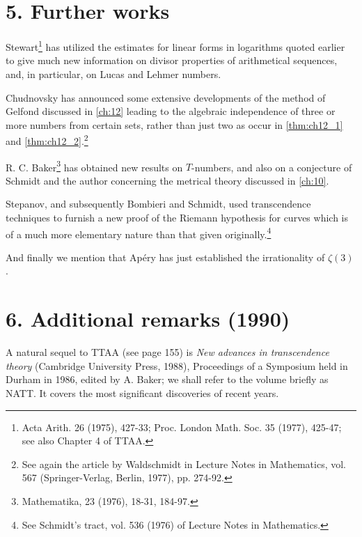 \section*{5. Further works}

Stewart\footnote{Acta Arith. 26 (1975), 427-33; Proc. London Math. Soc. 35 (1977), 425-47; see also Chapter 4 of TTAA.} has utilized the estimates for linear forms in logarithms quoted earlier to give much new information on divisor properties of arithmetical sequences, and, in particular, on Lucas and Lehmer numbers.

Chudnovsky has announced some extensive developments of the method of Gelfond discussed in \autoref{ch:12} leading to the algebraic independence of three or more numbers from certain sets, rather than just two as occur in \autoref{thm:ch12_1} and \autoref{thm:ch12_2}.\footnote{See again the article by Waldschmidt in Lecture Notes in Mathematics, vol. 567 (Springer-Verlag, Berlin, 1977), pp. 274-92.}

R. C. Baker\footnote{Mathematika, 23 (1976), 18-31, 184-97.} has obtained new results on \(T\)-numbers, and also on a conjecture of Schmidt and the author concerning the metrical theory discussed in \autoref{ch:10}.

Stepanov, and subsequently Bombieri and Schmidt, used transcendence techniques to furnish a new proof of the Riemann hypothesis for curves which is of a much more elementary nature than that given originally.\footnote{See Schmidt's tract, vol. 536 (1976) of Lecture Notes in Mathematics.}

And finally we mention that Ap{\'e}ry has just established the irrationality of \(\zeta(3)\).

\section*{6. Additional remarks (1990)}

A natural sequel to TTAA (see page 155) is \textit{New advances in transcendence theory} (Cambridge University Press, 1988), Proceedings of a Symposium held in Durham in 1986, edited by A. Baker; we shall refer to the volume briefly as NATT. It covers the most significant discoveries of recent years.

